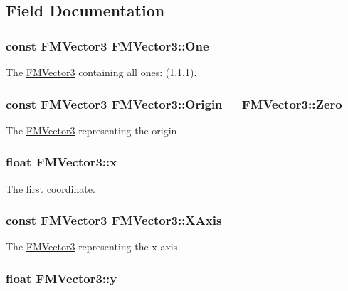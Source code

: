 \subsection{Field Documentation}
\hypertarget{classFMVector3_a7f981857b8d0f3f6839c0a9ff0c3e430}{
\subsubsection[{One}]{\setlength{\rightskip}{0pt plus 5cm}const {\bf FMVector3} {\bf FMVector3::One}}}
\label{classFMVector3_a7f981857b8d0f3f6839c0a9ff0c3e430}
The \hyperlink{classFMVector3}{FMVector3} containing all ones: (1,1,1). \hypertarget{classFMVector3_a886c355491c083e2664286caa7aa9ed8}{
\subsubsection[{Origin}]{\setlength{\rightskip}{0pt plus 5cm}const {\bf FMVector3} {\bf FMVector3::Origin} = {\bf FMVector3::Zero}}}
\label{classFMVector3_a886c355491c083e2664286caa7aa9ed8}
The \hyperlink{classFMVector3}{FMVector3} representing the origin \hypertarget{classFMVector3_ab31613614892bba88807d31b2c9ee87e}{
\subsubsection[{x}]{\setlength{\rightskip}{0pt plus 5cm}float {\bf FMVector3::x}}}
\label{classFMVector3_ab31613614892bba88807d31b2c9ee87e}
The first coordinate. \hypertarget{classFMVector3_a363010f82c60ec1d53a495de6284daf7}{
\subsubsection[{XAxis}]{\setlength{\rightskip}{0pt plus 5cm}const {\bf FMVector3} {\bf FMVector3::XAxis}}}
\label{classFMVector3_a363010f82c60ec1d53a495de6284daf7}
The \hyperlink{classFMVector3}{FMVector3} representing the x axis \hypertarget{classFMVector3_a6e8a45596a095d86205557d7231ef973}{
\subsubsection[{y}]{\setlength{\rightskip}{0pt plus 5cm}float {\bf FMVector3::y}}}
